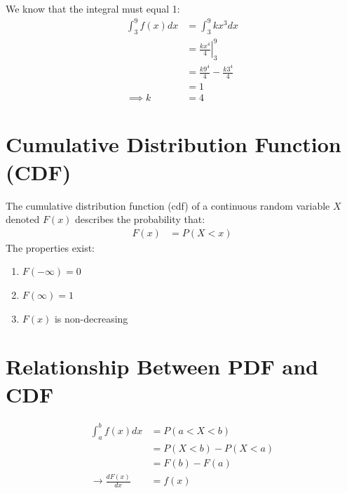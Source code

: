                     We know that the integral must equal 1:
                    \begin{align*}
                        \int_3^9 f(x) dx &= \int_3^9 k x^3 dx \\
                        &= \left. \frac{k x^4}{4} \right|_3^9 \\
                        &= \frac{k 9^4}{4} - \frac{k 3^4}{4} \\
                        &= 1 \\
                        \implies k &= 4
                    \end{align*}
            \section{Cumulative Distribution Function (CDF)} %
            \label{sec:cumulative_distribution_function_cdf}
                The cumulative distribution function (cdf) of a continuous random variable $X$ denoted $F(x)$ describes the probability that:
                \begin{align*}
                    F(x) &= P(X < x)
                \end{align*}
                The properties exist:
                \begin{enumerate}
                    \item $F(- \infty) = 0$
                    \item $F(\infty) = 1$
                    \item $F(x)$ is non-decreasing
                \end{enumerate}
            \section{Relationship Between PDF and CDF} %
            \label{sec:relationship_between_pdf_and_cdf}
                \begin{align*}
                    \int_a^b f(x)dx &= P(a < X < b) \\
                    &= P(X < b) - P(X < a) \\
                    &= F(b) - F(a) \\
                    \to \frac{d F(x)}{dx} &= f(x)
                \end{align*}
